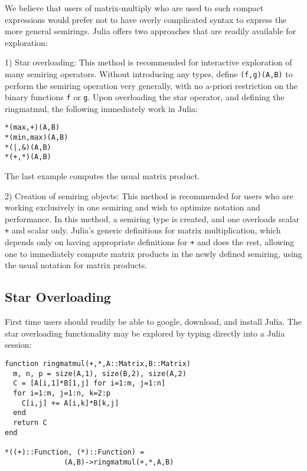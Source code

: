 \documentclass[conference]{IEEEtran}
\begin{document}
We believe that users of matrix-multiply who are used
to such compact expressions would prefer not to have
overly complicated syntax to express the more general
semirings.  Julia offers two approaches that are readily
available for exploration:

1) Star overloading:
This method is recommended for interactive exploration of many semiring operators.
Without introducing any types, define  {\tt *(f,g)(A,B)} to
perform the semiring operation very generally, with no a-priori restriction
on the binary functions {\tt f} or {\tt g}.   Upon overloading the star operator,
and defining the ringmatmul, the following immediately work in Julia:
\begin{verbatim}
*(max,+)(A,B)
*(min,max)(A,B)
*(|,&)(A,B)
*(+,*)(A,B)
\end{verbatim}
The last example computes the usual matrix product.

2) Creation of semiring objects:
This method is recommended for users who are working exclusively in one semiring and wish to optimize notation and performance.
In this method, a semiring type is created, and one overloads scalar {\tt +} and scalar {\tt *} only.
Julia's generic definitions for matrix multiplication, which depends only on having appropriate definitions for {\tt +} and {\tt *} does the rest, allowing one to immediately compute matrix products in the newly defined semiring, using the usual notation for matrix products.

\subsection{Star Overloading}

First time users should readily be able to google, download, and install Julia.
The star overloading functionality may be explored by typing directly into a Julia session:
\begin{verbatim}
function ringmatmul(+,*,A::Matrix,B::Matrix)
  m, n, p = size(A,1), size(B,2), size(A,2)
  C = [A[i,1]*B[1,j] for i=1:m, j=1:n]
  for i=1:m, j=1:n, k=2:p
    C[i,j] += A[i,k]*B[k,j]
  end
  return C
end

*((+)::Function, (*)::Function) = 
              (A,B)->ringmatmul(+,*,A,B)
\end{verbatim}
\end{document}
